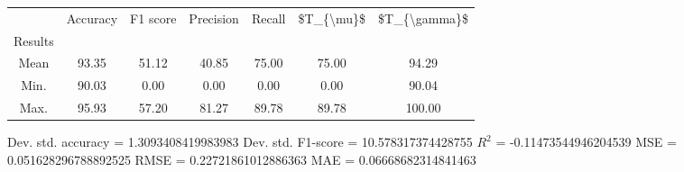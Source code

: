 \begin{tabular}{|c|c|c|c|c|c|c|}
\toprule
{} &  Accuracy &  F1 score &  Precision &  Recall &  \$T\_\{\textbackslash mu\}\$ &  \$T\_\{\textbackslash gamma\}\$ \\
Results &           &           &            &         &            &               \\
\hline
Mean    &     93.35 &     51.12 &      40.85 &   75.00 &      75.00 &         94.29 \\
Min.    &     90.03 &      0.00 &       0.00 &    0.00 &       0.00 &         90.04 \\
Max.    &     95.93 &     57.20 &      81.27 &   89.78 &      89.78 &        100.00 \\
\bottomrule
\end{tabular}

 Dev. std. accuracy = 1.3093408419983983
 Dev. std. F1-score = 10.578317374428755
 $R^2$ = -0.11473544946204539
 MSE = 0.051628296788892525
 RMSE = 0.22721861012886363
 MAE = 0.06668682314841463